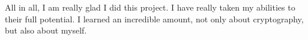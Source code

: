 \documentclass[12pt, a4paper, draft]{report}
\begin{document}
All in all, I am really glad I did this project. I have really
taken my abilities to their full potential. I learned an incredible
amount, not only about cryptography, but also about myself.




\nocite{*}



\end{document}
